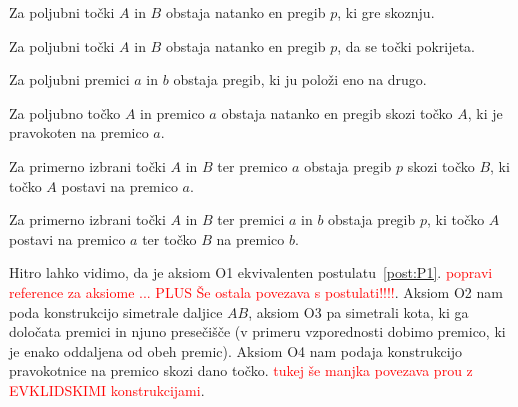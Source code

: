 \begin{aksiom}[O1]
    \label{aks:O1}
    Za poljubni točki $A$ in $B$ obstaja natanko en pregib $p$, ki gre skoznju.
\end{aksiom}
\begin{aksiom}[O2]
    \label{aks:O2}
    Za poljubni točki $A$ in $B$ obstaja natanko en pregib $p$, da se točki pokrijeta.
\end{aksiom}
\begin{aksiom}[O3]
    \label{aks:O3}
    Za poljubni premici $a$ in $b$ obstaja pregib, ki ju položi eno na drugo.
\end{aksiom}
\begin{aksiom}[O4]
    \label{aks:O4}
    Za poljubno točko $A$ in premico $a$ obstaja natanko en pregib skozi točko $A$, ki je pravokoten na premico $a$.
\end{aksiom}
\begin{aksiom}[o5]
    \label{aks:O5}
    Za primerno izbrani točki $A$ in $B$ ter premico $a$ obstaja pregib $p$ skozi točko $B$, ki točko $A$ postavi na premico $a$.
\end{aksiom}
\begin{aksiom}[06]
    \label{aks:O6}
    Za primerno izbrani točki $A$ in $B$ ter premici $a$ in $b$ obstaja pregib $p$, ki točko $A$ postavi na premico $a$ ter točko $B$ na premico $b$.
\end{aksiom}
\begin{aksiom}[O7]
    \label{aks:O7}

\end{aksiom}

Hitro lahko vidimo, da je aksiom O1 ekvivalenten postulatu~\ref{post:P1}. \textcolor{red}{popravi reference za aksiome ... PLUS Še ostala povezava s postulati!!!!}. Aksiom O2 nam poda konstrukcijo simetrale daljice $AB$, aksiom O3 pa simetrali kota, ki ga določata premici in njuno presečišče (v primeru vzporednosti dobimo premico, ki je enako oddaljena od obeh premic). Aksiom O4 nam podaja konstrukcijo pravokotnice na premico skozi dano točko. \textcolor{red}{tukej še manjka povezava prou z EVKLIDSKIMI konstrukcijami}.

